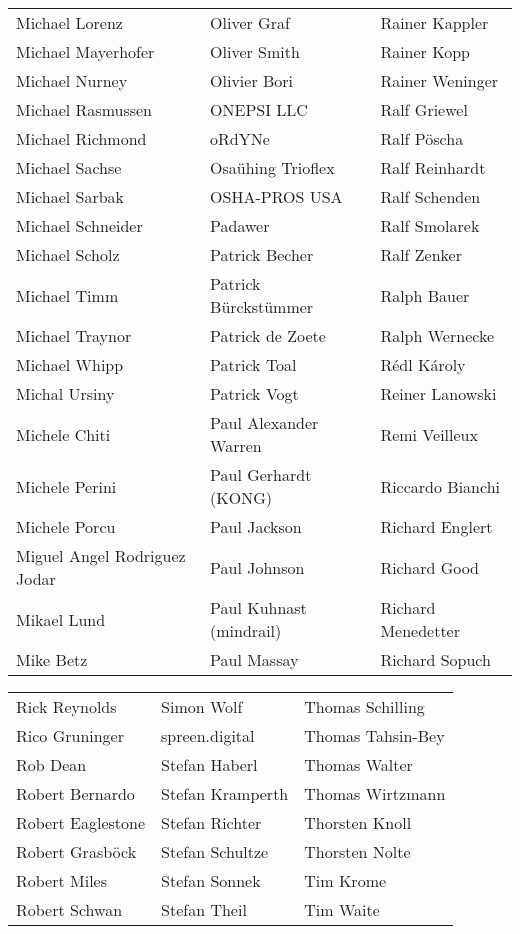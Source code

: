 \begin{small}
\begin{tabular}{p{4cm}p{4cm}p{4cm}}
Michael Lorenz & Oliver Graf & Rainer Kappler \\
Michael Mayerhofer & Oliver Smith & Rainer Kopp \\
Michael Nurney & Olivier Bori & Rainer Weninger \\
Michael Rasmussen & ONEPSI LLC & Ralf Griewel \\
Michael Richmond & oRdYNe & Ralf Pöscha \\
Michael Sachse & Osaühing Trioflex & Ralf Reinhardt \\
Michael Sarbak & OSHA-PROS USA & Ralf Schenden \\
Michael Schneider & Padawer & Ralf Smolarek \\
Michael Scholz & Patrick Becher & Ralf Zenker \\
Michael Timm & Patrick Bürckstümmer & Ralph Bauer \\
Michael Traynor & Patrick de Zoete & Ralph Wernecke \\
Michael Whipp & Patrick Toal & Rédl Károly \\
Michal Ursiny & Patrick Vogt & Reiner Lanowski \\
Michele Chiti & Paul Alexander Warren & Remi Veilleux \\
Michele Perini & Paul Gerhardt (KONG) & Riccardo Bianchi \\
Michele Porcu & Paul Jackson & Richard Englert \\
Miguel Angel Rodriguez Jodar & Paul Johnson & Richard Good \\
Mikael Lund & Paul Kuhnast (mindrail) & Richard Menedetter \\
Mike Betz & Paul Massay & Richard Sopuch \\
\end{tabular}
\newpage
\setlength{\tabcolsep}{1mm}
\begin{tabular}{p{4cm}p{4cm}p{4cm}}
Rick Reynolds & Simon Wolf & Thomas Schilling \\
Rico Gruninger & spreen.digital & Thomas Tahsin-Bey \\
Rob Dean & Stefan Haberl & Thomas Walter \\
Robert Bernardo & Stefan Kramperth & Thomas Wirtzmann \\
Robert Eaglestone & Stefan Richter & Thorsten Knoll \\
Robert Grasböck & Stefan Schultze & Thorsten Nolte \\
Robert Miles & Stefan Sonnek & Tim Krome \\
Robert Schwan & Stefan Theil & Tim Waite \\

\end{tabular}
\end{small}
